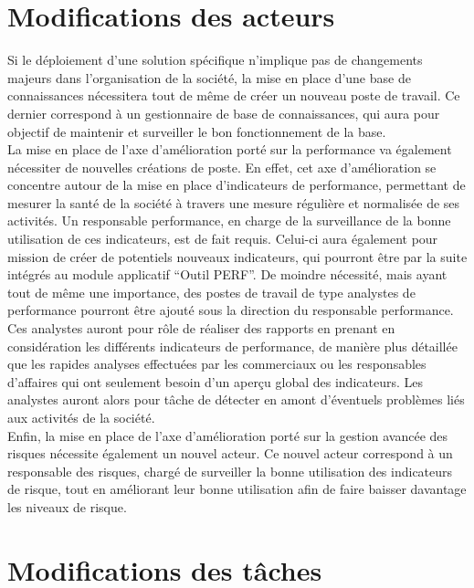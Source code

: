 \section{Modifications des acteurs}

Si le déploiement d’une solution spécifique n’implique pas de changements majeurs dans l’organisation de la société, la mise en place d’une base de connaissances nécessitera tout de même de créer un nouveau poste de travail. Ce dernier correspond à un gestionnaire de base de connaissances, qui aura pour objectif de maintenir et surveiller le bon fonctionnement de la base. \\

La mise en place de l’axe d’amélioration porté sur la performance va également nécessiter de nouvelles créations de poste. En effet, cet axe d’amélioration se concentre autour de la mise en place d’indicateurs de performance, permettant de mesurer la santé de la société à travers une mesure régulière et normalisée de ses activités. Un responsable performance, en charge de la surveillance de la bonne utilisation de ces indicateurs, est de fait requis. Celui-ci aura également pour mission de créer de potentiels nouveaux indicateurs, qui pourront être par la suite intégrés au module applicatif “Outil PERF”. De moindre nécessité, mais ayant tout de même une importance, des postes de travail de type analystes de performance pourront être ajouté sous la direction du responsable performance. Ces analystes auront pour rôle de réaliser des rapports en prenant en considération les différents indicateurs de performance, de manière plus détaillée que les rapides analyses effectuées par les commerciaux ou les responsables d’affaires qui ont seulement besoin d’un aperçu global des indicateurs. Les analystes auront alors pour tâche de détecter en amont d’éventuels problèmes liés aux activités de la société. \\

Enfin, la mise en place de l’axe d’amélioration porté sur la gestion avancée des risques nécessite également un nouvel acteur. Ce nouvel acteur correspond à un responsable des risques, chargé de surveiller la bonne utilisation des indicateurs de risque, tout en améliorant leur bonne utilisation afin de faire baisser davantage les niveaux de risque.

\section{Modifications des tâches}

